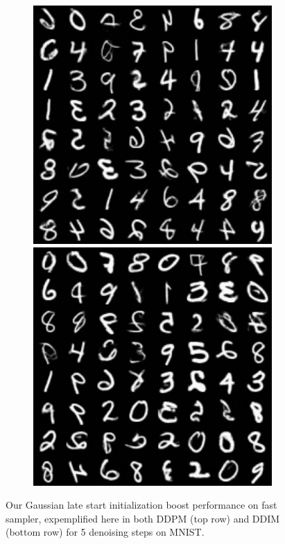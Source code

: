 \begin{figure}[!ht]
\begin{subfigure}{0.495\textwidth}
  \end{subfigure}
  \begin{subfigure}{0.495\textwidth}
    \includegraphics[width=\linewidth]{figs/imgs/ddpm_ddpm_mnist_data_samples_T_800_5_steps.jpg}
    \includegraphics[width=\linewidth]{figs/imgs/ddpm_ddim_mnist_data_samples_T_800_5_steps.jpg}
  \end{subfigure} 
  \caption{Our Gaussian late start initialization boost performance on fast sampler, expemplified here in both DDPM (top row) and DDIM (bottom row) for 5 denoising steps on MNIST.}
  \label{subfig:glsddim_mnist}
\end{figure}


